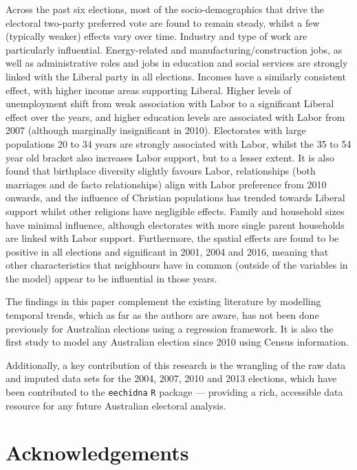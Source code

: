 \documentclass[times, doublespace]{anzsauth}
\begin{document}
Across the past six elections, most of the socio-demographics that drive the electoral two-party preferred vote are found to remain steady, whilst a few (typically weaker) effects vary over time. Industry and type of work are particularly influential. Energy-related and manufacturing/construction jobs, as well as administrative roles and jobs in education and social services are strongly linked with the Liberal party in all elections. Incomes have a similarly consistent effect, with higher income areas supporting Liberal. Higher levels of unemployment shift from weak association with Labor to a significant Liberal effect over the years, and higher education levels are associated with Labor from 2007 (although marginally insignificant in 2010). Electorates with large populations 20 to 34 years are strongly associated with Labor, whilst the 35 to 54 year old bracket also increases Labor support, but to a lesser extent. It is also found that birthplace diversity slightly favours Labor, relationships (both marriages and de facto relationships) align with Labor preference from 2010 onwards, and the influence of Christian populations has trended towards Liberal support whilst other religions have negligible effects. Family and household sizes have minimal influence, although electorates with more single parent households are linked with Labor support. Furthermore, the spatial effects are found to be positive in all elections and significant in 2001, 2004 and 2016, meaning that other characteristics that neighbours have in common (outside of the variables in the model) appear to be influential in those years.

The findings in this paper complement the existing literature by modelling temporal trends, which as far as the authors are aware, has not been done previously for Australian elections using a regression framework. It is also the first study to model any Australian election since 2010 using Census information.

Additionally, a key contribution of this research is the wrangling of the raw data and imputed data sets for the 2004, 2007, 2010 and 2013 elections, which have been contributed to the \texttt{eechidna} \texttt{R} package --- providing a rich, accessible data resource for any future Australian electoral analysis.

\hypertarget{acknowledgements}{%
\section{Acknowledgements}\label{acknowledgements}}
\end{document}
